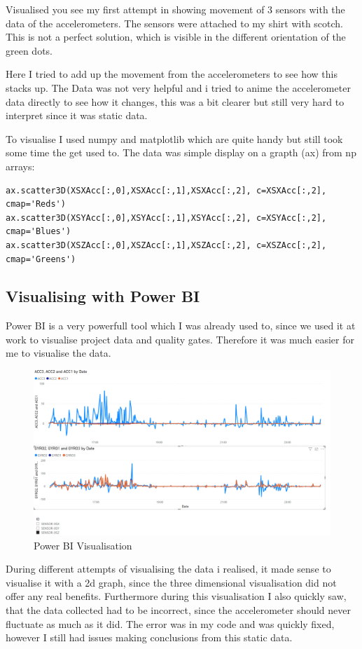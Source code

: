 Visualised you see my first attempt in showing movement of 3 sensors with the data of the accelerometers. The sensors were attached to my shirt with scotch. This is not a perfect solution, which is visible in the different orientation of the green dots. 

Here I tried to add up the movement from the accelerometers to see how this stacks up. The Data was not very helpful and i tried to anime the accelerometer data directly to see how it changes, this was a bit clearer but still very hard to interpret since it was static data. 

To visualise I used numpy and matplotlib which are quite handy but still took some time the get used to.
The data was simple display on a grapth (ax) from np arrays:

\begin{lstlisting}
ax.scatter3D(XSXAcc[:,0],XSXAcc[:,1],XSXAcc[:,2], c=XSXAcc[:,2], cmap='Reds')
ax.scatter3D(XSYAcc[:,0],XSYAcc[:,1],XSYAcc[:,2], c=XSYAcc[:,2], cmap='Blues')
ax.scatter3D(XSZAcc[:,0],XSZAcc[:,1],XSZAcc[:,2], c=XSZAcc[:,2], cmap='Greens')
\end{lstlisting}

\subsection{Visualising with Power BI}

Power BI is a very powerfull tool which I was already used to, since we used it at work to visualise project data and quality gates. Therefore it was much easier for me to visualise the data.

\begin{figure}[h]
\begin{center}
\includegraphics[width=0.7\linewidth]{images/PowerBIVisualisiation.png}
  \end{center}
  \caption{Power BI Visualisation}
  \label{fig:PowerBIVisualisation}
\end{figure}

During different attempts of visualising the data i realised, it made sense to visualise it with a 2d graph, since the three dimensional visualisation did not offer any real benefits. Furthermore during this visualisation I also quickly saw, that the data collected had to be incorrect, since the accelerometer should never fluctuate as much as it did. The error was in my code and was quickly fixed, however I still had issues making conclusions from this static data.

\newpage